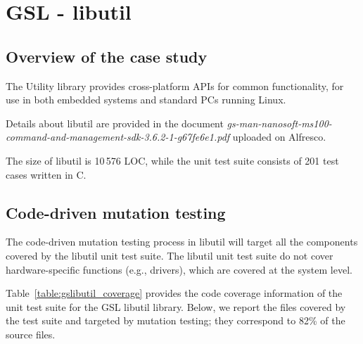 

\section{GSL - libutil}
\label{sec:caseStudies:GSL:libutil}

\subsection{Overview of the case study}

The Utility library provides cross-platform APIs for common functionality, for use in both embedded systems and standard PCs running Linux. 

Details about libutil are provided in the document \emph{gs-man-nanosoft-ms100-command-and-management-sdk-3.6.2-1-g67fe6e1.pdf} uploaded on Alfresco.

The size of libutil is 10\,576 LOC, while the unit test suite consists of 201 test cases written in C.

\subsection{Code-driven mutation testing}

The code-driven mutation testing process in libutil will target all the components covered by the libutil unit test suite. 
The libutil unit test suite do not cover hardware-specific functions (e.g., drivers), which are covered at the system level.



Table~\ref{table:gslibutil_coverage} provides the code coverage information of the unit test suite for the GSL libutil library. 
Below, we report the files covered by the test suite and targeted by mutation testing; they correspond to 82\% of the source files. %

